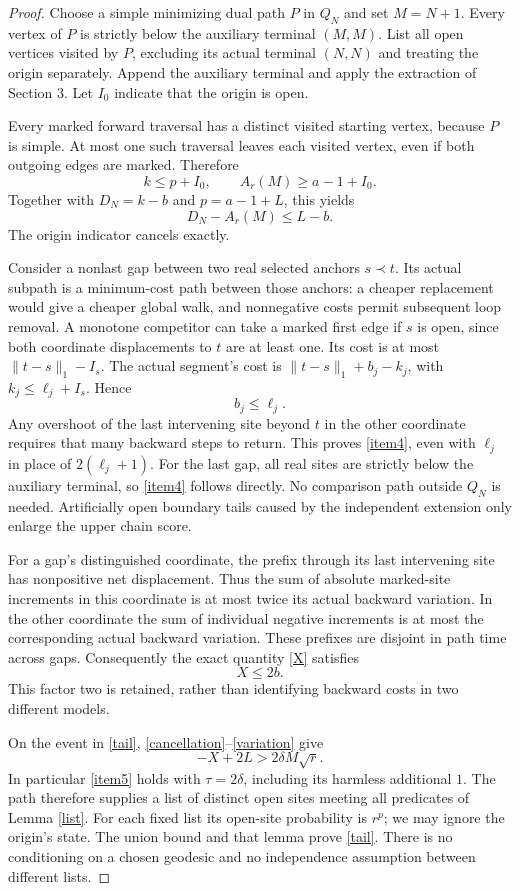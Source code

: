 \documentclass[11pt]{article}
\begin{document}
\begin{proof}
Choose a simple minimizing dual path $P$ in $Q_N$ and set $M=N+1$.
Every vertex of $P$ is strictly below the auxiliary terminal
$(M,M)$. List all open vertices visited by $P$, excluding its actual
terminal $(N,N)$ and treating the origin separately. Append the
auxiliary terminal and apply the extraction of Section 3. Let
$I_0$ indicate that the origin is open.

Every marked forward traversal has a distinct visited starting
vertex, because $P$ is simple. At most one such traversal leaves
each visited vertex, even if both outgoing edges are marked.
Therefore
\[
 k\le p+I_0,\qquad A_r(M)\ge a-1+I_0.
\]
Together with $D_N=k-b$ and $p=a-1+L$, this yields
\begin{equation}\label{cancellation}
 D_N-A_r(M)\le L-b.
\end{equation}
The origin indicator cancels exactly.

Consider a nonlast gap between two real selected anchors $s\prec t$.
Its actual subpath is a minimum-cost path between those anchors:
a cheaper replacement would give a cheaper global walk, and
nonnegative costs permit subsequent loop removal. A monotone
competitor can take a marked first edge if $s$ is open, since
both coordinate displacements to $t$ are at least one. Its cost is
at most $\|t-s\|_1-I_s$. The actual segment's cost is
$\|t-s\|_1+b_j-k_j$, with $k_j\le\ell_j+I_s$. Hence
\[
 b_j\le\ell_j.
\]
Any overshoot of the last intervening site beyond $t$ in the other
coordinate requires that many backward steps to return. This proves
\eqref{item4}, even with $\ell_j$ in place of $2(\ell_j+1)$.
For the last gap, all real sites are strictly below the auxiliary
terminal, so \eqref{item4} follows directly. No comparison path
outside $Q_N$ is needed. Artificially open boundary tails caused by
the independent extension only enlarge the upper chain score.

For a gap's distinguished coordinate, the prefix through its last
intervening site has nonpositive net displacement. Thus the sum of
absolute marked-site increments in this coordinate is at most twice
its actual backward variation. In the other coordinate the sum of
individual negative increments is at most the corresponding actual
backward variation. These prefixes are disjoint in path time across
gaps. Consequently the exact quantity \eqref{X} satisfies
\begin{equation}\label{variation}
 X\le2b.
\end{equation}
This factor two is retained, rather than identifying backward costs
in two different models.

On the event in \eqref{tail}, \eqref{cancellation}--\eqref{variation}
give
\[
 -X+2L>2\delta M\sqrt r.
\]
In particular \eqref{item5} holds with $\tau=2\delta$, including
its harmless additional $1$. The path therefore supplies a list of
distinct open sites meeting all predicates of Lemma \ref{list}.
For each fixed list its open-site probability is $r^p$; we may
ignore the origin's state. The union bound and that lemma prove
\eqref{tail}. There is no conditioning on a chosen geodesic and no
independence assumption between different lists.
\end{proof}
\end{document}
